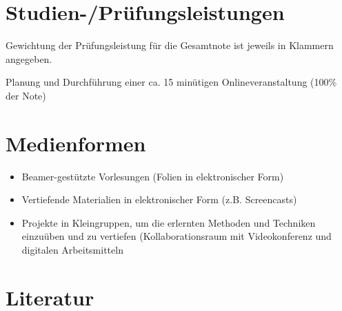 \section*{Studien-/Prüfungsleistungen\label{/mi-2017/modulbeschreibungen-master/MA_SC_WPF_CSCL}}\label{studien-pruxfcfungsleistungenpathlabelmi-2017modulbeschreibungen-mastermaux5fscux5fwpfux5fcscl}

Gewichtung der Prüfungsleistung für die Gesamtnote ist jeweils in
Klammern angegeben.

Planung und Durchführung einer ca. 15 minütigen Onlineveranstaltung
(100\% der Note)

\section*{Medienformen\label{/mi-2017/modulbeschreibungen-master/MA_SC_WPF_CSCL}}\label{medienformenpathlabelmi-2017modulbeschreibungen-mastermaux5fscux5fwpfux5fcscl}

\begin{itemize}
\tightlist
\item
  Beamer-gestützte Vorlesungen (Folien in elektronischer Form)
\item
  Vertiefende Materialien in elektronischer Form (z.B. Screencasts)
\item
  Projekte in Kleingruppen, um die erlernten Methoden und Techniken
  einzuüben und zu vertiefen (Kollaborationsraum mit Videokonferenz und
  digitalen Arbeitsmitteln
\end{itemize}

\section*{Literatur\label{/mi-2017/modulbeschreibungen-master/MA_SC_WPF_CSCL}}\label{literaturpathlabelmi-2017modulbeschreibungen-mastermaux5fscux5fwpfux5fcscl}

